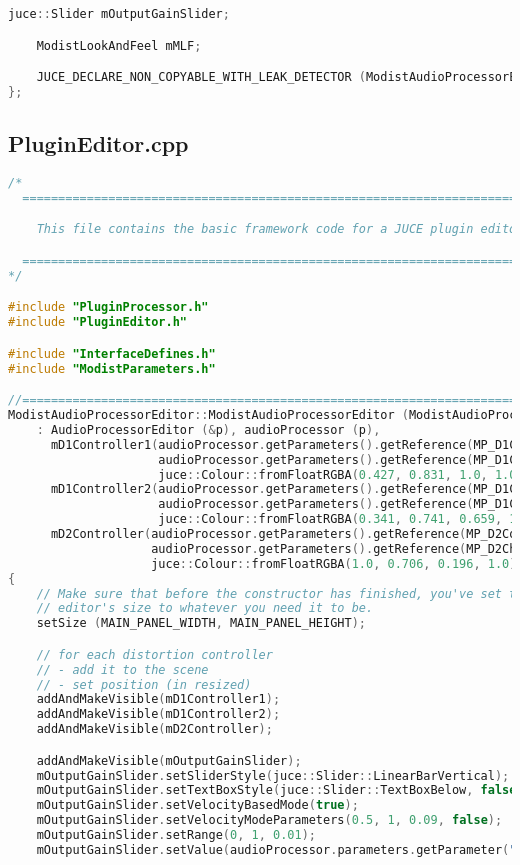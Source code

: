 \documentclass{article}
\begin{document}
\begin{appendix}
\begin{lstlisting}[language=C++]
    juce::Slider mOutputGainSlider;

    ModistLookAndFeel mMLF;

    JUCE_DECLARE_NON_COPYABLE_WITH_LEAK_DETECTOR (ModistAudioProcessorEditor)
};
\end{lstlisting}
\pagebreak
\subsection{PluginEditor.cpp}
\begin{lstlisting}[language=C++]
/*
  ==============================================================================

    This file contains the basic framework code for a JUCE plugin editor.

  ==============================================================================
*/

#include "PluginProcessor.h"
#include "PluginEditor.h"

#include "InterfaceDefines.h"
#include "ModistParameters.h"

//==============================================================================
ModistAudioProcessorEditor::ModistAudioProcessorEditor (ModistAudioProcessor& p)
    : AudioProcessorEditor (&p), audioProcessor (p),
      mD1Controller1(audioProcessor.getParameters().getReference(MP_D1Control1),
                     audioProcessor.getParameters().getReference(MP_D1Choice1),
                     juce::Colour::fromFloatRGBA(0.427, 0.831, 1.0, 1.0)),
      mD1Controller2(audioProcessor.getParameters().getReference(MP_D1Control2),
                     audioProcessor.getParameters().getReference(MP_D1Choice2),
                     juce::Colour::fromFloatRGBA(0.341, 0.741, 0.659, 1.0)),
      mD2Controller(audioProcessor.getParameters().getReference(MP_D2Control),
                    audioProcessor.getParameters().getReference(MP_D2Choice),
                    juce::Colour::fromFloatRGBA(1.0, 0.706, 0.196, 1.0))
{
    // Make sure that before the constructor has finished, you've set the
    // editor's size to whatever you need it to be.
    setSize (MAIN_PANEL_WIDTH, MAIN_PANEL_HEIGHT);

    // for each distortion controller
    // - add it to the scene
    // - set position (in resized)
    addAndMakeVisible(mD1Controller1);
    addAndMakeVisible(mD1Controller2);
    addAndMakeVisible(mD2Controller);

    addAndMakeVisible(mOutputGainSlider);
    mOutputGainSlider.setSliderStyle(juce::Slider::LinearBarVertical);
    mOutputGainSlider.setTextBoxStyle(juce::Slider::TextBoxBelow, false, mOutputGainSlider.getTextBoxWidth(), mOutputGainSlider.getTextBoxHeight());
    mOutputGainSlider.setVelocityBasedMode(true);
    mOutputGainSlider.setVelocityModeParameters(0.5, 1, 0.09, false);
    mOutputGainSlider.setRange(0, 1, 0.01);
    mOutputGainSlider.setValue(audioProcessor.parameters.getParameter("OutputGain")->getValue());


\end{lstlisting}
\end{appendix}
\end{document}
